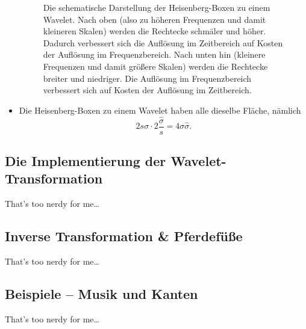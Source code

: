 \begin{remark}
\begin{itemize}
\begin{figure}[ht]
  \caption{Die schematische Darstellung der Heisenberg-Boxen zu einem Wavelet. Nach oben (also
  zu höheren Frequenzen und damit kleineren Skalen) werden die Rechtecke schmäler und höher. Dadurch
  verbessert sich die Auflösung im Zeitbereich auf Kosten der Auflösung im Frequenzbereich. Nach 
  unten
  hin (kleinere Frequenzen und damit größere Skalen) werden die Rechtecke breiter und niedriger. Die
  Auflösung im Frequenzbereich verbessert sich auf Kosten der Auflösung im Zeitbereich.}
  \label{fig:Heisenberg-Box-Wavelet-Anpassung}
  \end{figure}
\item Die Heisenberg-Boxen zu einem Wavelet haben alle dieselbe Fläche, nämlich
  \[
    2s\sigma \cdot 2\frac{\widehat{\sigma}}{s} = 4 \sigma \widehat{\sigma}.
  \]
\end{itemize}
\end{remark}

\subsection{Die Implementierung der Wavelet-Transformation}
That's too nerdy for me\dots

\subsection{Inverse Transformation \& Pferdefüße}
That's too nerdy for me\dots

\subsection{Beispiele -- Musik und Kanten}
That's too nerdy for me\dots

